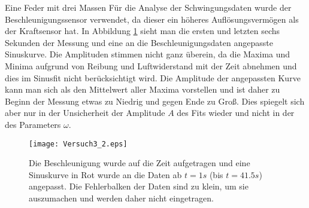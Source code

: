 \documentclass{alex_gp}
\begin{document}
\begin{mybox}{Eine Feder mit drei Massen}
	Für die Analyse der Schwingungsdaten wurde der Beschleunigungssensor verwendet, da dieser ein höheres Auflösungsvermögen als der Kraftsensor hat. In Abbildung \ref{fig:sine} sieht man die ersten und letzten sechs Sekunden der Messung und eine an die Beschleunigungsdaten angepasste Sinuskurve. Die Amplituden stimmen nicht ganz überein, da die Maxima und Minima aufgrund von Reibung und Luftwiderstand mit der Zeit abnehmen und dies im Sinusfit nicht berücksichtigt wird. Die Amplitude der angepassten Kurve kann man sich als den Mittelwert aller Maxima vorstellen und ist daher zu Beginn der Messung etwas zu Niedrig und gegen Ende zu Groß. Dies spiegelt sich aber nur in der Unsicherheit der Amplitude \( A \) des Fits wieder und nicht in der des Parameters \( \omega \).
	
	\begin{figure}[H]
		\centering
		\texttt{[image: Versuch3\_2.eps]}
		\caption{Die Beschleunigung wurde auf die Zeit aufgetragen und eine Sinuskurve in Rot wurde an die Daten ab \( t = 1 \unit{s} \) (bis \( t = 41.5 \unit{s} \)) angepasst. Die Fehlerbalken der Daten sind zu klein, um sie auszumachen und werden daher nicht eingetragen.}
		\label{fig:sine}
	\end{figure}
	

\end{mybox}
\end{document}
